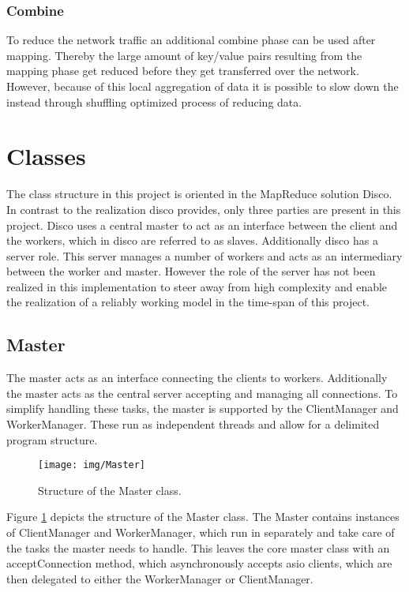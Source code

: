 \documentclass[12pt, letterpaper]{article}
\begin{document}
\subsubsection{Combine}
To reduce the network traffic an additional combine phase can be used after mapping. Thereby the large amount of key/value pairs resulting from the mapping phase get reduced before they get transferred over the network. However, because of this local aggregation of data it is possible to slow down the instead through shuffling optimized process of reducing data.

\section{Classes}

The class structure in this project is oriented in the MapReduce solution Disco. In contrast to the realization disco provides, only three parties are present in this project. Disco uses a central master to act as an interface between the client and the workers, which in disco are referred to as slaves. Additionally disco has a server role. This server manages a number of workers and acts as an intermediary between the worker and master. However the role of the server has not been realized in this implementation to steer away from high complexity and enable the realization of a reliably working model in the time-span of this project.

\subsection{Master}

The master acts as an interface connecting the clients to workers. Additionally the master acts as the central server accepting and managing all connections. To simplify handling these tasks, the master is supported by the ClientManager and WorkerManager. These run as independent threads and allow for a delimited program structure.

\begin{figure}[h]
	\centering
	\texttt{[image: img/Master]}
	\caption{Structure of the Master class.}
	\label{fig:classes_Master}
\end{figure}

Figure \ref{fig:classes_Master} depicts the structure of the Master class. The Master contains instances of ClientManager and WorkerManager, which run in separately and take care of the tasks the master needs to handle. This leaves the core master class with an acceptConnection method, which asynchronously accepts asio clients, which are then delegated to either the WorkerManager or ClientManager.    
\end{document}
